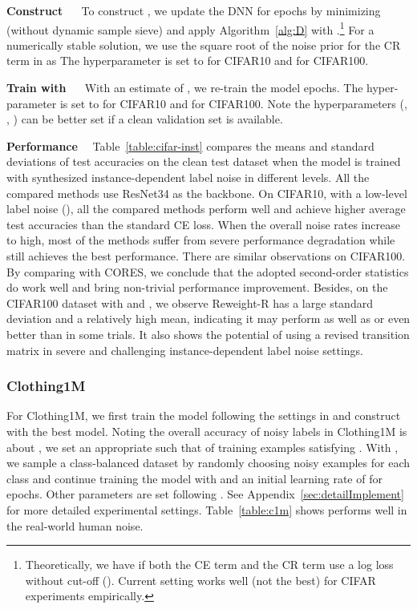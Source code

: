 \documentclass[final]{cvpr}
\newcommand{\SPL}{CORES}
\newcommand{\covpeer}{\text{CAL}}
\begin{document}
\noindent\textbf{Construct }~~
To construct , we update the DNN for  epochs by minimizing  (without dynamic sample sieve) and apply Algorithm~\ref{alg:D} with .\footnote{Theoretically, we have  if both the CE term and the CR term use a log loss without cut-off (). Current setting works well (not the best) for CIFAR experiments empirically.}
For a numerically stable solution, we use the square root of the noise prior for the CR term in  as 
The hyperparameter  is set to  for CIFAR10 and  for CIFAR100.

\noindent\textbf{Train with \covpeer{}}~~
With an estimate of , we re-train the model  epochs.
The hyper-parameter  is set to  for CIFAR10 and  for CIFAR100.
Note the hyperparameters (, , ) can be better set if a clean validation set is available.

\noindent\textbf{Performance}~~
Table~\ref{table:cifar-inst} compares the means and standard deviations of test accuracies on the clean test dataset when the model is trained with synthesized instance-dependent label noise in different levels. 
All the compared methods use ResNet34 as the backbone.
On CIFAR10, with a low-level label noise (), all the compared methods perform well and achieve higher average test accuracies than the standard CE loss.
When the overall noise rates increase to high, most of the methods suffer from severe performance degradation while \covpeer{} still achieves the best performance.
There are similar observations on CIFAR100.
By comparing \covpeer{} with \SPL{}, we conclude that the adopted second-order statistics do work well and bring non-trivial performance improvement. 
Besides, on the CIFAR100 dataset with  and , we observe Reweight-R \cite{xia2019anchor} has a large standard deviation and a relatively high mean, indicating it may perform as well as or even better than \covpeer{} in some trials. 
It also shows the potential of using a revised transition matrix  \cite{xia2019anchor} in severe and challenging instance-dependent label noise settings.



\subsubsection{Clothing1M}
For Clothing1M, we first train the model following the settings in \cite{sieve2020} and construct  with the best model.
Noting the overall accuracy of noisy labels in Clothing1M is about  \cite{xiao2015learning}, we set an appropriate  such that  of training examples satisfying .
With , we sample a class-balanced dataset by randomly choosing  noisy examples for each class and continue training the model with  and an initial learning rate of  for  epochs.
Other parameters are set following \cite{sieve2020}.
See Appendix~\ref{sec:detailImplement} for more detailed experimental settings.
Table~\ref{table:c1m} shows \covpeer{} performs well in the real-world human noise.
\end{document}
